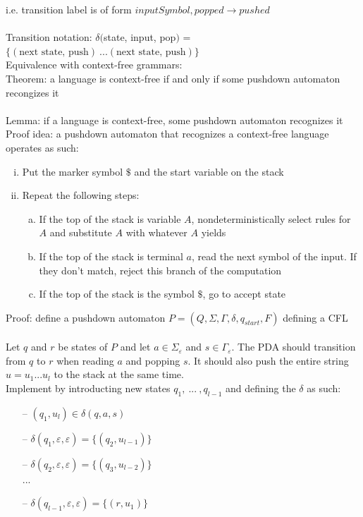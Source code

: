 \documentclass{article}
\newcommand*{\<}{\langle}
\renewcommand*{\>}{\rangle}
\begin{document}
			i.e. transition label is of form $inputSymbol, popped \to pushed$ \\
			\\
			Transition notation: $\delta($state, input, pop$)$ = $\{(\text{next state, push})\:...(\text{next state, push})\}$
			\\
			Equivalence with context-free grammars: \\
			Theorem: a language is context-free if and only if some pushdown automaton recongizes it \\
			\\
			Lemma: if a language is context-free, some pushdown automaton recognizes it \\
			Proof idea: a pushdown automaton that recognizes a context-free language operates as such:
			\begin{enumerate}[(i)]
				\item Put the marker symbol $\$$ and the start variable on the stack
				\item Repeat the following steps:
				\begin{enumerate}[(a)]
					\item If the top of the stack is variable $A$, nondeterministically select rules for $A$ and substitute $A$ with whatever $A$ yields
					\item If the top of the stack is terminal $a$, read the next symbol of the input. If they don't match, reject this branch of the computation
					\item If the top of the stack is the symbol $\$$, go to accept state
					\end{enumerate}
				\end{enumerate}
			Proof: define a pushdown automaton $P = (Q, \Sigma, \Gamma, \delta, q_{start}, F)$ defining a CFL \\
			\\
			Let $q$ and $r$ be states of $P$ and let $a \in \Sigma_\varepsilon$ and $s \in \Gamma_\varepsilon$. The PDA should transition from $q$ to $r$ when reading $a$ and popping $s$. It should also push the entire string $u = u_1...u_l$ to the stack at the same time. \\
			Implement by introducting new states $q_1,\:...\:, q_{l - 1}$ and defining the $\delta$ as such:
			\begin{itemize}
				\item[--] $(q_1, u_l) \in \delta(q, a, s)$
				\item[--] $\delta(q_1, \varepsilon, \varepsilon) = \{(q_2, u_{l - 1})\}$
				\item[--] $\delta(q_2, \varepsilon, \varepsilon) = \{(q_3, u_{l - 2})\}$ \\
				...
				\item[--] $\delta(q_{l - 1}, \varepsilon, \varepsilon) = \{(r, u_1)\}$
				\end{itemize}
\end{document}
